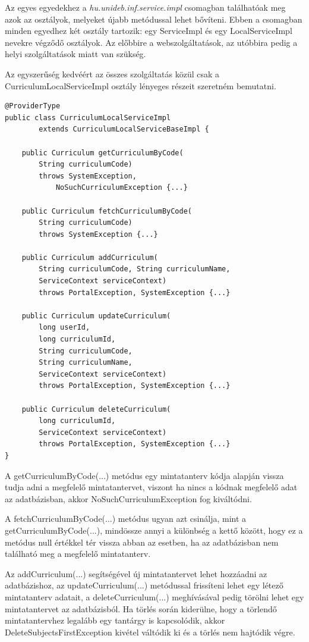 \documentclass[hidelinks, 12pt, a4paper]{report}
\begin{document}
Az egyes egyedekhez a \emph{hu.unideb.inf.service.impl} csomagban találhatóak meg azok az osztályok, melyeket újabb metódussal lehet bővíteni. Ebben a csomagban minden egyedhez két osztály tartozik: egy ServiceImpl és egy LocalServiceImpl nevekre végződő osztályok. Az előbbire a webszolgáltatások, az utóbbira pedig a helyi szolgáltatások miatt van szükség.

Az egyszerűség kedvéért az összes szolgáltatás közül csak a CurriculumLocalServiceImpl osztály lényeges részeit szeretném bemutatni.

\begin{minipage}{\linewidth}
\begin{lstlisting}[basicstyle=\small]
@ProviderType
public class CurriculumLocalServiceImpl
		extends CurriculumLocalServiceBaseImpl {
	
	public Curriculum getCurriculumByCode(
		String curriculumCode)
		throws SystemException,
			NoSuchCurriculumException {...}

	public Curriculum fetchCurriculumByCode(
		String curriculumCode)
		throws SystemException {...}

	public Curriculum addCurriculum(
		String curriculumCode, String curriculumName,
		ServiceContext serviceContext)
		throws PortalException, SystemException {...}

	public Curriculum updateCurriculum(
		long userId,
		long curriculumId,
		String curriculumCode,
		String curriculumName,
		ServiceContext serviceContext)
		throws PortalException, SystemException {...}

	public Curriculum deleteCurriculum(
		long curriculumId,
		ServiceContext serviceContext)
		throws PortalException, SystemException {...}
}
\end{lstlisting}
\end{minipage}

A getCurriculumByCode(...) metódus egy mintatanterv kódja alapján vissza tudja adni a megfelelő mintatantervet, viszont ha nincs a kódnak megfelelő adat az adatbázisban, akkor NoSuchCurriculumException fog kiváltódni.

A fetchCurriculumByCode(...) metódus ugyan azt csinálja, mint a getCurriculumByCode(...), mindössze annyi a különbség a kettő között, hogy ez a metódus null értékkel tér vissza abban az esetben, ha az adatbázisban nem található meg a megfelelő mintatanterv.

Az addCurriculum(...) segítségével új mintatantervet lehet hozzáadni az adatbázishoz, az updateCurriculum(...) metódussal frissíteni lehet egy létező mintatanterv adatait, a deleteCurriculum(...) meghívásával pedig törölni lehet egy mintatantervet az adatbázisból. Ha törlés során kiderülne, hogy a törlendő mintatantervhez legalább egy tantárgy is kapcsolódik, akkor DeleteSubjectsFirstException kivétel váltódik ki és a törlés nem hajtódik végre.
\end{document}
